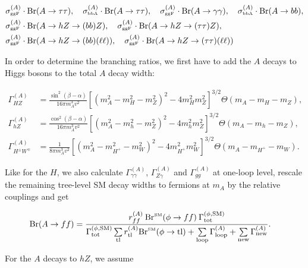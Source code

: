 \documentclass[aps,superscriptaddress,nofootinbib,floatfix,notitlepage]{revtex4-1}
\begin{document}
\begin{align}
&\sigma ^{(A)}_{\text{\tiny{ggF}}} \cdot {\rm Br}(A\to \tau \tau ) , \quad \sigma ^{(A)}_{\text{\tiny{bbA}}} \cdot {\rm Br}(A\to \tau \tau ), \quad\sigma ^{(A)}_{\text{\tiny{ggF}}} \cdot {\rm Br}(A\to \gamma \gamma ) ,  \quad  \sigma ^{(A)}_{\text{\tiny{bbA}}} \cdot {\rm Br}(A\to bb), \nonumber \\%
&\sigma ^{(A)}_{\text{\tiny{ggF}}} \cdot {\rm Br}(A\to hZ \to (bb)Z),  \quad  \sigma ^{(A)}_{\text{\tiny{ggF}}} \cdot {\rm Br}(A\to hZ \to (\tau \tau )Z), \nonumber \\ %
&\sigma ^{(A)}_{\text{\tiny{ggF}}} \cdot {\rm Br}(A\to hZ \to (bb)(\ell \ell )),  \quad \sigma ^{(A)}_{\text{\tiny{ggF}}} \cdot {\rm Br}(A\to hZ \to (\tau \tau )(\ell \ell )) \nonumber %
\end{align}

In order to determine the branching ratios, we first have to add the $A$ decays to Higgs bosons to the total $A$ decay width:

\begin{align}
 \Gamma ^{(A)}_{HZ} &= \frac{\sin^2 (\beta -\alpha )}{16 \pi m_A^3 v^2} \left[ (m_A^2-m_H^2-m_Z^2)^2-4 m_H^2 m_Z^2\right] ^{3/2}  \Theta (m_A-m_H-m_Z), \nonumber \\
 \Gamma ^{(A)}_{hZ} &= \frac{\cos^2 (\beta -\alpha )}{16 \pi m_A^3 v^2} \left[ (m_A^2-m_h^2-m_Z^2)^2-4 m_h^2 m_Z^2\right] ^{3/2}  \Theta (m_A-m_h-m_Z), \nonumber \\
 \Gamma ^{(A)}_{H^\pm W^\mp } &= \frac{1}{8 \pi m_A^3 v^2} \left[ (m_A^2-m_{H^+}^2-m_W^2)^2-4 m_{H^+}^2 m_W^2\right] ^{3/2}  \Theta (m_A-m_{H^+}-m_W). \nonumber
\end{align}

Like for the $H$, we also calculate $\Gamma_{\gamma \gamma}^{(A)}$, $\Gamma_{Z \gamma}^{(A)}$ and $\Gamma_{gg}^{(A)}$ at one-loop level, rescale the remaining tree-level SM decay widths to fermions at $m_A$ by the relative couplings and get

\begin{align}
 {\rm Br}(A\to ff) &= \frac{r_{ff}^{(A)} \: {\rm Br}^{\text{\tiny{SM}}} (\phi \to ff) \: \Gamma^{(\phi ,\text{SM})}_{\text{tot}}}{\Gamma^{(\phi ,\text{SM})}_{\text{tot}} \sum\limits_{\rm tl} r_{\rm tl}^{(A)} {\rm Br}^{\text{\tiny{SM}}} (\phi \to {\rm tl}) + \sum\limits_{\rm loop} \Gamma_{\rm loop}^{(A)} + \sum\limits_{\rm new} \Gamma_{\rm new}^{(A)}} \nonumber .
\end{align}

For the $A$ decays to $hZ$, we assume
\end{document}
